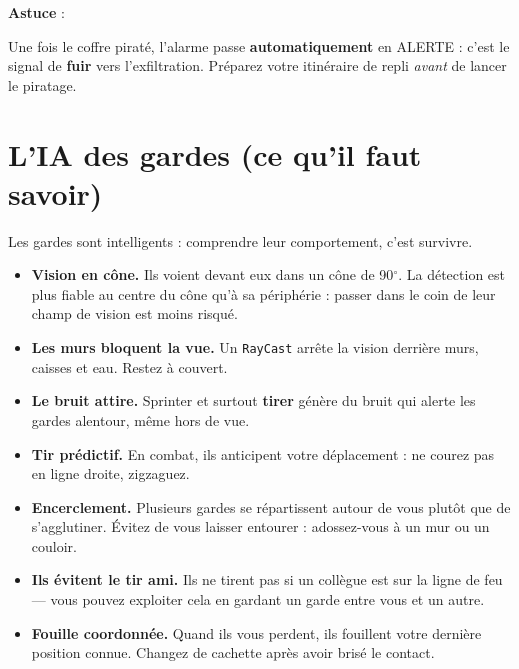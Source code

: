 \documentclass[11pt,a4paper]{article}
\newenvironment{astuce}{%
  \begin{lrbox}{\astucebox}%
  \begin{minipage}{\dimexpr0.93\linewidth-2\fboxsep}\color{eclipsedark}%
  \textbf{\textcolor{eclipsegreen}{Astuce}} :\ %
}{%
  \end{minipage}%
  \end{lrbox}%
  \begin{center}\colorbox{tipbg}{\usebox{\astucebox}}\end{center}%
}
\begin{document}
\begin{astuce}
Une fois le coffre pirat\'e, l'alarme passe \textbf{automatiquement} en ALERTE :
c'est le signal de \textbf{fuir} vers l'exfiltration. Pr\'eparez votre
itin\'eraire de repli \emph{avant} de lancer le piratage.
\end{astuce}

\section{L'IA des gardes (ce qu'il faut savoir)}
Les gardes sont \og{}intelligents\fg{} : comprendre leur comportement, c'est
survivre.
\begin{itemize}[leftmargin=1.4em]
  \item \textbf{Vision en c\^one.} Ils voient devant eux dans un c\^one de
  90$^\circ$. La d\'etection est plus fiable au centre du c\^one qu'\`a sa
  p\'eriph\'erie : passer dans le coin de leur champ de vision est moins risqu\'e.
  \item \textbf{Les murs bloquent la vue.} Un \texttt{RayCast} arr\^ete la vision
  derri\`ere murs, caisses et eau. Restez \`a couvert.
  \item \textbf{Le bruit attire.} Sprinter et surtout \textbf{tirer} g\'en\`ere
  du bruit qui alerte les gardes alentour, m\^eme hors de vue.
  \item \textbf{Tir pr\'edictif.} En combat, ils anticipent votre d\'eplacement :
  ne courez pas en ligne droite, zigzaguez.
  \item \textbf{Encerclement.} Plusieurs gardes se r\'epartissent autour de vous
  plut\^ot que de s'agglutiner. \'Evitez de vous laisser entourer : adossez-vous
  \`a un mur ou un couloir.
  \item \textbf{Ils \'evitent le tir ami.} Ils ne tirent pas si un coll\`egue est
  sur la ligne de feu --- vous pouvez exploiter cela en gardant un garde entre
  vous et un autre.
  \item \textbf{Fouille coordonn\'ee.} Quand ils vous perdent, ils fouillent
  votre derni\`ere position connue. Changez de cachette apr\`es avoir bris\'e le
  contact.
\end{itemize}

\end{document}
